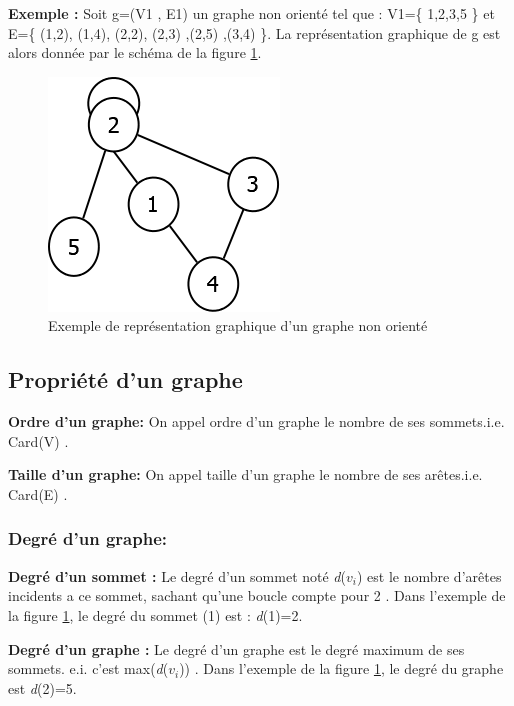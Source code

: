 \textbf{Exemple :}
 Soit g=(V1 , E1) un graphe non orienté tel que : V1=\{ 1,2,3,5 \} et E=\{ (1,2), (1,4), (2,2), (2,3) ,(2,5) ,(3,4) \}.
La représentation graphique de g est alors donnée par le schéma de la figure \ref{graphNonOriente}.
\\
\begin{figure}[H]
\begin{center}
\includegraphics[height=120 pt, width=130 pt]{./ressources/image/graphNonOriente.png} 
\end{center}
\caption{Exemple de représentation graphique d'un graphe non orienté}
\label{graphNonOriente}
\end{figure}

		\subsection{Propriété d'un graphe} %
		
			\textbf{Ordre d'un graphe:} On appel ordre d’un 					graphe le nombre de ses sommets.i.e. Card(V) \citep{DUT}.
			
			\textbf{Taille d'un graphe:} On appel taille d’un 				graphe le nombre de ses arêtes.i.e. Card(E) \citep{DUT}.
			
			\subsubsection{Degré d'un graphe:} %
			\textbf{Degré d'un sommet : } Le degré d’un sommet 					noté \textit{d}($\textit{v}_{i}$) est le nombre 					d'arêtes incidents a ce sommet, sachant qu’une boucle 			compte pour 2 \citep{muller} . Dans l'exemple de la figure \ref{graphNonOriente}, le 					degré du sommet (1) est : \textit{d}(1)=2.
			
			\textbf{Degré d'un graphe : }Le degré d’un graphe est 			le degré maximum de ses sommets. e.i. c’est 						max(\textit{d}($\textit{v}_{i}$)) \citep{muller}. Dans l’exemple de 				la figure \ref{graphNonOriente}, le degré du graphe est \textit{d}(2)=5.
			

